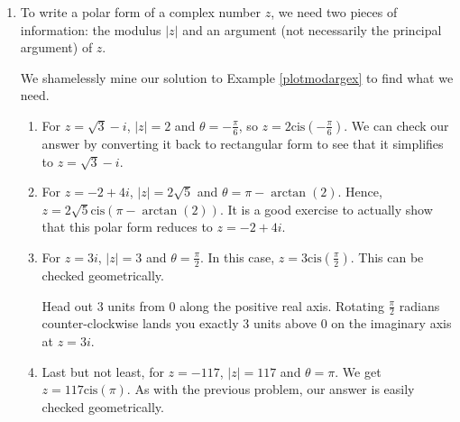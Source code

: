 \documentclass{ximera}
\begin{document}
\begin{example}
\begin{explanation}
\begin{enumerate}
\begin{enumerate}
\item Expanding, we get $z = 2 \text{cis}\left(-\frac{3\pi}{4}\right) = 2\left[\cos\left(-\frac{3\pi}{4}\right) + i \sin\left(-\frac{3\pi}{4}\right)\right]$. Hence, $z= -\sqrt{2} - i\sqrt{2}$, so $\text{Re}(z) = -\sqrt{2} = \text{Im}(z)$.

\item  We get  $z = 3 \text{cis}(0) = 3\left[\cos(0) + i\sin(0)\right] = 3$.  Writing $3 = 3 + 0i$, we get $\text{Re}(z) = 3$ and $\text{Im}(z) = 0$, which makes sense seeing as $3$ is a real number.

\item  Lastly, we have  $z = \text{cis}\left(\frac{\pi}{2}\right) = \cos\left(\frac{\pi}{2}\right)+ i\sin\left(\frac{\pi}{2}\right) = i$.  Since $i = 0 + 1i$, we get $\text{Re}(z) = 0$ and $\text{Im}(z) = 1$.  Since $i$ is called the `imaginary unit,'  these answers make perfect sense.

\end{enumerate}

\item  To write a polar form of a complex number $z$, we need two pieces of information:  the modulus $|z|$ and an argument (not necessarily the principal argument) of $z$.   

 

We shamelessly mine our solution to  Example \ref{plotmodargex} to find what we need.

\begin{enumerate}

\item  For $z = \sqrt{3}-i$, $|z| = 2$ and $\theta = -\frac{\pi}{6}$, so $z = 2 \text{cis}\left(-\frac{\pi}{6}\right)$.  We can check our answer by converting it back to rectangular form to see that it simplifies to $z = \sqrt{3} - i$.

\item  For $z = -2+4i$, $|z| = 2\sqrt{5}$ and $\theta = \pi - \arctan(2)$.  Hence, $z = 2\sqrt{5} \text{cis}(\pi - \arctan(2))$.  It is a good exercise to actually show that this polar form reduces to $z=-2+4i$.

\item  For $z = 3i$, $|z| = 3$ and $\theta = \frac{\pi}{2}$.  In this case, $z = 3 \text{cis}\left(\frac{\pi}{2}\right)$.  This can be checked geometrically.  

 

Head out $3$ units from $0$ along the positive real axis. Rotating $\frac{\pi}{2}$ radians counter-clockwise lands you exactly $3$ units above $0$ on the imaginary axis at $z = 3i$.

\item  Last but not least, for $z = -117$, $|z| = 117$ and $\theta = \pi$. We get $z = 117 \text{cis}(\pi)$. As with the previous problem, our answer is easily checked geometrically. 

\end{enumerate}

\end{enumerate}
\end{explanation}
\end{example}
\end{document}
